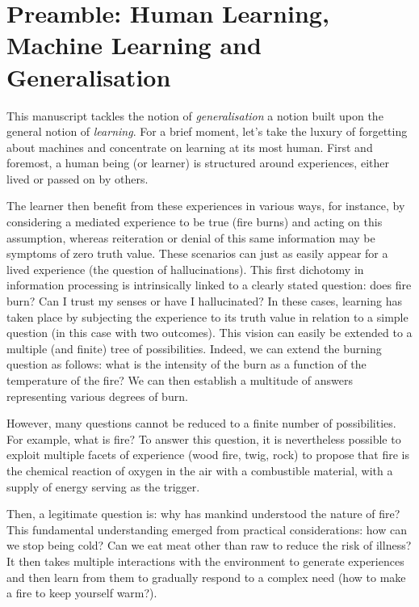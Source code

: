 \chapter*{Preamble: Human Learning, Machine Learning and Generalisation}
\mtcaddchapter



This manuscript tackles the notion of \emph{generalisation} a notion built upon the general notion of \emph{learning}. For a brief moment, let's take the luxury of forgetting about machines and concentrate on learning at its most human. First and foremost, a human being (or learner) is structured around experiences, either lived or passed on by others. 

The learner then benefit from these experiences in various ways, for instance, by considering a mediated experience to be true (fire burns) and acting on this assumption, whereas reiteration or denial of this same information may be symptoms of zero truth value.  These scenarios can just as easily appear for a lived experience (the question of hallucinations). This first dichotomy in information processing is intrinsically linked to a clearly stated question: does fire burn? Can I trust my senses or have I hallucinated? In these cases, learning has taken place by subjecting the experience to its truth value in relation to a simple question (in this case with two outcomes).  This vision can easily be extended to a multiple (and finite) tree of possibilities. Indeed, we can extend the burning question as follows: what is the intensity of the burn as a function of the temperature of the fire? We can then establish a multitude of answers representing various degrees of burn. 

However, many questions cannot be reduced to a finite number of possibilities. For example, what is fire? To answer this question, it is nevertheless possible to exploit multiple facets of experience (wood fire, twig, rock) to propose that fire is the chemical reaction of oxygen in the air with a combustible material, with a supply of energy serving as the trigger. 

Then, a legitimate question is: why has mankind understood the nature of fire? This fundamental understanding emerged from practical considerations: how can we stop being cold? Can we eat meat other than raw to reduce the risk of illness? It then takes multiple interactions with the environment to generate experiences and then learn from them to gradually respond to a complex need (how to make a fire to keep yourself warm?).


